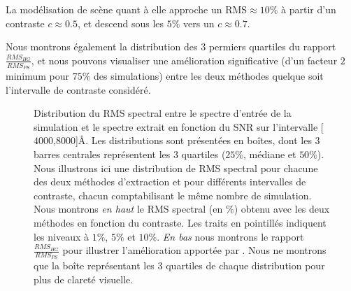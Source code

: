 \documentclass[../main/main.tex]{subfiles}
\begin{document}
La modélisation de scène quant à elle
approche un RMS$\approx10\%$ à partir d'un contraste $c\approx0.5$, et
descend sous les $5\%$ vers un $c\approx0.7$. 

Nous montrons également la distribution des 3 permiers quartiles du
rapport $\frac{RMS_{HG}}{RMS_{PS}}$, et nous pouvons visualiser une
amélioration significative (d'un facteur $2$ minimum pour $75\%$ des simulations) entre les deux
méthodes quelque soit l'intervalle de contraste considéré. 

\begin{figure}[ht]
  \centering
  \caption[Distribution du RMS spectral en fonction du
  SNR.]{Distribution du RMS spectral entre le spectre d'entrée de la
    simulation et le spectre extrait en fonction du SNR  sur l'intervalle [$4000$,$8000$]\AA. Les
    distributions sont présentées en boîtes, dont les 3 barres
    centrales représentent les 3 quartiles ($25\%$, médiane et $50\%$). Nous illustrons ici une
    distribution de RMS spectral pour chacune des deux méthodes
    d'extraction et pour différents intervalles de contraste, chacun comptabilisant le
    même nombre de simulation. Nous montrons \emph{en haut} le RMS
    spectral (en $\%$) obtenu avec les deux méthodes 
    en fonction du contraste. Les traits en pointillés indiquent les niveaux à
    $1\%$, $5\%$ et $10\%$. \emph{En bas} nous montrons le rapport
    $\frac{RMS_{HG}}{RMS_{PS}}$ pour illustrer l'amélioration apportée par
    \hypergal. Nous ne montrons que la boîte représentant les 3 quartiles de
    chaque distribution pour plus de clareté visuelle.}
  \label{fig:simu_rms_snr_spectrophoto}
\end{figure}
\end{document}

